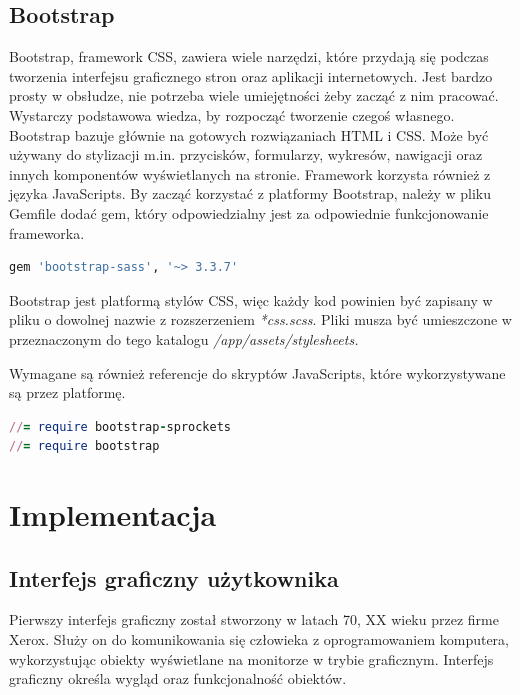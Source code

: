 \documentclass[openright]{xmgr}
\begin{document}
	\section{Bootstrap}
	
	Bootstrap, framework CSS, zawiera wiele narzędzi, które przydają się podczas tworzenia interfejsu graficznego stron oraz aplikacji internetowych. Jest bardzo prosty w obsłudze, nie potrzeba wiele umiejętności żeby zacząć z nim pracować. Wystarczy podstawowa wiedza, by rozpocząć tworzenie czegoś własnego. Bootstrap bazuje głównie na gotowych rozwiązaniach HTML i CSS. Może być używany do stylizacji m.in. przycisków, formularzy, wykresów, nawigacji oraz innych komponentów wyświetlanych na stronie. Framework korzysta również z języka JavaScripts. By zacząć korzystać z platformy Bootstrap, należy w pliku Gemfile dodać gem, który odpowiedzialny jest za odpowiednie funkcjonowanie frameworka.
	
	\begin{lstlisting}[language=Ruby,lineskip={-1pt},caption=Plik \textit{Gemfile}]
gem 'bootstrap-sass', '~> 3.3.7'
	\end{lstlisting}

	Bootstrap jest platformą stylów CSS, więc każdy kod powinien być zapisany w pliku o dowolnej nazwie z rozszerzeniem \textit{*css.scss}. Pliki musza być umieszczone w przeznaczonym do tego katalogu \textit{/app/assets/stylesheets.\textbf{}}\\	
	
	\begin{flushleft}
		Wymagane są również referencje do skryptów JavaScripts, które wykorzystywane są przez platformę.
	\end{flushleft}
	
	\begin{lstlisting}[language=Ruby,lineskip={-1pt},caption=Referencje do skryptów JavaScripts]
//= require bootstrap-sprockets
//= require bootstrap
	\end{lstlisting}
	
	\chapter{Implementacja}
	
	\section {Interfejs graficzny użytkownika}
	
	Pierwszy interfejs graficzny został stworzony w latach 70, XX wieku przez firme Xerox. Służy on do komunikowania się człowieka z oprogramowaniem komputera, wykorzystując obiekty wyświetlane na monitorze w trybie graficznym. Interfejs graficzny określa wygląd oraz funkcjonalność obiektów. \\
\end{document}
